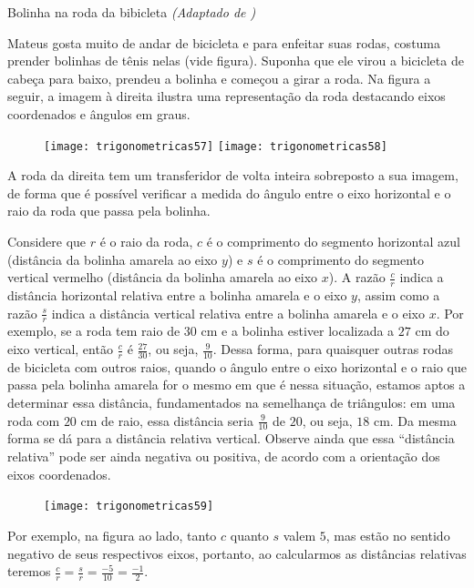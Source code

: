 \begin{task}{Bolinha na roda da bibicleta}
\label{trig-ativ16}
\textit{(Adaptado de \cite{costa2017})}

Mateus gosta muito de andar de bicicleta e para enfeitar suas rodas, costuma prender bolinhas de tênis nelas (vide figura). Suponha que ele virou a bicicleta de cabeça para baixo, prendeu a bolinha e começou a girar a roda. Na figura a seguir, a imagem à direita ilustra uma representação da roda destacando eixos coordenados e ângulos em graus.

\begin{figure}[H]
\centering

\texttt{[image: trigonometricas57]}
\texttt{[image: trigonometricas58]}
\end{figure}


A roda da direita tem um transferidor de volta inteira sobreposto a sua imagem, de forma que é possível verificar a medida do ângulo entre o eixo horizontal e o raio da roda que passa pela bolinha.

Considere que $r$ é o raio da roda, $c$ é o comprimento do segmento horizontal azul (distância da bolinha amarela ao eixo $y$) e $s$ é o comprimento do segmento vertical vermelho (distância da bolinha amarela ao eixo $x$). A razão $\frac{c}{r}$ indica a distância horizontal relativa entre a bolinha amarela e o eixo $y$, assim como a razão $\frac{s}{r}$ indica a distância vertical relativa entre a bolinha amarela e o eixo $x$. Por exemplo, se a roda tem raio de $30$ cm e a bolinha estiver localizada a $27$ cm do eixo vertical, então $\frac{c}{r}$ é $\frac{27}{30}$, ou seja, $\frac{9}{10}$. Dessa forma, para quaisquer outras rodas de bicicleta com outros raios, quando o ângulo entre o eixo horizontal e o raio que passa pela bolinha amarela for o mesmo em que é nessa situação, estamos aptos a determinar essa distância, fundamentados na semelhança de triângulos: em uma roda com $20$ cm de raio, essa distância seria $\frac{9}{10}$ de $20$, ou seja, $18$ cm. Da mesma forma se dá para a distância relativa vertical. Observe ainda que essa “distância relativa”{} pode ser ainda negativa ou positiva, de acordo com a orientação dos eixos coordenados.


\begin{figure}
\vspace{-1em}
\texttt{[image: trigonometricas59]}
\end{figure}

Por exemplo, na figura ao lado, tanto $c$ quanto $s$ valem $5$, mas estão no sentido negativo de seus respectivos eixos, portanto, ao calcularmos as distâncias relativas teremos $\frac{c}{r}=\frac{s}{r}=\frac{-5}{10}=\frac{-1}{2}$.  


\end{task}
